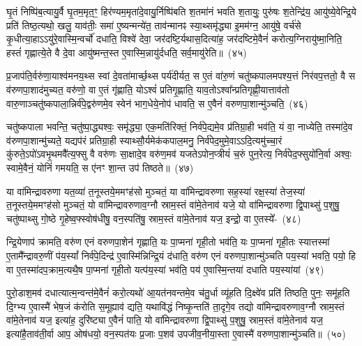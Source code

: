 घृ॒तं निष्पि॑ब॒त्यायु॒र्वै घृ॒तम॒मृत॒ꣳ॒ हिर॑ण्यम॒मृता॑दे॒वायु॒र्निष्पि॑बति श॒तमा॑नं भवति श॒तायुः॒ पुरु॑षः श॒तेन्द्रि॑य॒ आयु॑ष्ये॒वेन्द्रि॒ये प्रति॑ तिष्ठ॒त्यथो॒ खलु॒ याव॑तीः॒ समा॑ ए॒ष्यन्मन्ये॑त॒ ताव॑न्मानꣴ स्या॒थ्समृ॑द्ध्या इ॒मम॑ग्न॒ आयु॑षे॒ वर्च॑से कृ॒धीत्या॒हा\-ऽऽ\-यु॑रे॒वास्मि॒न्वर्चो॑ दधाति॒ विश्वे॑ देवा॒ जर॑दष्टि॒र्यथास॒दित्या॑ह॒ जर॑दष्टिमे॒वैनं॑ करोत्य॒ग्निरायु॑ष्मा॒निति॒ हस्तं॑ गृह्णात्ये॒ते वै दे॒वा आयु॑ष्मन्त॒स्त ए॒वास्मि॒न्नायु॑र्दधति॒ सर्व॒मायु॑रेति॥~(४५)\ip

{\anuvakamend[{रसं॑ दे॒वाना॒ꣴ॒ स्तोमे॒नेति॒ हिर॑ण्या॒दस॒दिति॒ द्वाविꣳ॑शतिश्च}]}%

प्र॒जा\-प॑ति॒र्वरु॑णा॒याश्व॑मनय॒थ्स स्वां दे॒वता॑मार्च्छ॒थ्स पर्य॑दीर्यत॒ स ए॒तं वा॑रु॒णं चतु॑ष्कपालमपश्य॒त्तं निर॑वप॒त्ततो॒ वै स व॑रुणपा॒शाद॑मुच्यत॒ वरु॑णो॒ वा ए॒तं गृ॑ह्णाति॒ यो\-ऽश्वं॑ प्रतिगृ॒ह्णाति॒ याव॒तो\-ऽश्वा᳚न्प्रतिगृह्णी॒यात्ताव॑तो वारु॒णाञ्चतु॑ष्कपाला॒न्निर्व॑पे॒द्वरु॑णमे॒व स्वेन॑ भाग॒\-धेये॒नोप॑ धावति॒ स ए॒वैनं॑ वरुणपा॒शान्मु॑ञ्चति॒~(४६)\ip

चतु॑ष्कपाला भवन्ति॒ चतु॑ष्पा॒द्ध्यश्वः॒ समृ॑द्ध्या॒ एक॒मति॑रिक्तं॒ निर्व॑पे॒द्यमे॒व प्र॑तिग्रा॒ही भव॑ति॒ यं वा॒ नाध्येति॒ तस्मा॑दे॒व व॑रुणपा॒शान्मु॑च्यते॒ यद्यप॑रं प्रतिग्रा॒ही स्याथ्सौ॒र्यमेक॑कपाल॒मनु॒ निर्व॑पेद॒मुमे॒वा\-ऽऽ\-दि॒त्यमु॑च्चा॒रं कु॑रुते॒\-ऽपो॑\-ऽवभृ॒थमवै᳚त्य॒फ्सु वै वरु॑णः सा॒क्षादे॒व वरु॑ण॒मव॑ यजते\-ऽपोन॒प्त्रीयं॑ च॒रुं पुन॒रेत्य॒ निर्व॑पेद॒फ्सुयो॑नि॒र्वा अश्वः॒ स्वामे॒वैनं॒ योनिं॑ गमयति॒ स ए॑नꣳ शा॒न्त उप॑ तिष्ठते॥~(४७)\ip

{\anuvakamend[{मु॒ञ्च॒ति॒ च॒रुꣳ स॒प्तद॑श च}]}%

या वा॑मिन्द्रावरुणा यत॒व्या॑ त॒नूस्तये॒ममꣳह॑सो मुञ्चतं॒ या वा॑मिन्द्रावरुणा सह॒स्या॑ रक्ष॒स्या॑ तेज॒स्या॑ त॒नूस्तये॒ममꣳह॑सो मुञ्चतं॒ यो वा॑मिन्द्रावरुणाव॒ग्नौ स्राम॒स्तं वा॑मे॒तेनाव॑ यजे॒ यो वा॑मिन्द्रावरुणा द्वि॒पाथ्सु॑ प॒शुषु॒ चतु॑ष्पाथ्सु गो॒ष्ठे गृ॒हेष्व॒फ्स्वोष॑धीषु॒ वन॒स्पति॑षु॒ स्राम॒स्तं वा॑मे॒तेनाव॑ यज॒ इन्द्रो॒ वा ए॒तस्ये᳚-~(४८)\ip

न्द्रि॒येणाप॑ क्रामति॒ वरु॑ण एनं वरुणपा॒शेन॑ गृह्णाति॒ यः पा॒प्मना॑ गृही॒तो भव॑ति॒ यः पा॒प्मना॑ गृही॒तः स्यात्तस्मा॑ ए॒तामै᳚न्द्रावरु॒णीं प॑य॒स्यां᳚ निर्व॑पे॒दिन्द्र॑ ए॒वास्मि॑न्निन्द्रि॒यं द॑धाति॒ वरु॑ण एनं वरुणपा॒शान्मु॑ञ्चति पय॒स्या॑ भवति॒ पयो॒ हि वा ए॒तस्मा॑दप॒क्राम॒त्यथै॒ष पा॒प्मना॑ गृही॒तो यत्प॑य॒स्या॑ भव॑ति॒ पय॑ ए॒वास्मि॒न्तया॑ दधाति पय॒स्या॑यां~(४९)\ip

पुरो॒डाश॒मव॑ दधात्यात्म॒न्वन्त॑मे॒वैनं॑ करो॒त्यथो॑ आ॒यत॑नवन्तमे॒व च॑तु॒र्धा व्यू॑हति दि॒क्ष्वे॑व प्रति॑ तिष्ठति॒ पुनः॒ समू॑हति दि॒ग्भ्य ए॒वास्मै॑ भेष॒जं क॑रोति स॒मूह्याव॑ द्यति॒ यथावि॑द्धं निष्कृ॒न्तति॑ ता॒दृगे॒व तद्यो वा॑मिन्द्रावरुणाव॒ग्नौ स्राम॒स्तं वा॑मे॒तेनाव॑ यज॒ इत्या॑ह॒ दुरि॑ष्ट्या ए॒वैनं॑ पाति॒ यो वा॑मिन्द्रावरुणा द्वि॒पाथ्सु॑ प॒शुषु॒ स्राम॒स्तं वा॑मे॒तेनाव॑ यज॒ इत्या॑है॒ताव॑ती॒र्वा आप॒ ओष॑धयो॒ वन॒स्पत॑यः प्र॒जाः प॒शव॑ उपजीव॒नीया॒स्ता ए॒वास्मै॑ वरुणपा॒शान्मु॑ञ्चति॥~(५०)\ip


